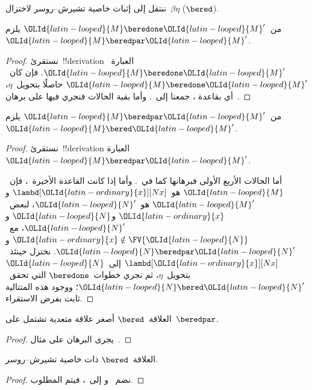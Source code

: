 \documentclass[../../../include/open-logic-section]{subfiles}
\begin{document}


ننتقل إلى إثبات خاصية تشيرش--روسر لاختزال~$\beta\eta$ ($\bered$).

\begin{lem}
  من~$\OLId{latin-looped}{M} \beredone \OLId{latin-looped}{M}'$ يلزم~$\OLId{latin-looped}{M} \beredpar \OLId{latin-looped}{M}'$.
\end{lem}

\begin{proof}
  نستقرئ~!!{derivation} العبارة~$\OLId{latin-looped}{M} \beredone \OLId{latin-looped}{M}'$.
  فإن كان~$\OLId{latin-looped}{M} \beredone \OLId{latin-looped}{M}'$ حاصلًا بتحويل~$\eta$، أي بقاعدة
  ، جمعنا
   إلى~.
  وأما بقية الحالات فنجري فيها على برهان~.
\end{proof}


\begin{lem}
  من~$\OLId{latin-looped}{M} \beredpar \OLId{latin-looped}{M}'$ يلزم~$\OLId{latin-looped}{M} \bered \OLId{latin-looped}{M}'$.
\end{lem}

\begin{proof}
  نستقرئ~!!{derivation} العبارة~$\OLId{latin-looped}{M} \beredpar \OLId{latin-looped}{M}'$.

  أما الحالات الأربع الأولى فبرهانها كما في~.
  وأما إذا كانت القاعدة الأخيرة~، فإن~$\OLId{latin-looped}{M}$
  هو~$\lambd[\OLId{latin-ordinary}{x}][Nx]$ و$\OLId{latin-looped}{M}'$ هو~$\OLId{latin-looped}{N}'$، لبعض~$\OLId{latin-ordinary}{x}$ و$\OLId{latin-looped}{N}$ و$\OLId{latin-looped}{N}'$،
  مع~$\OLId{latin-ordinary}{x} \notin \FV{\OLId{latin-looped}{N}}$ و$\OLId{latin-looped}{N} \beredpar \OLId{latin-looped}{N}'$.
  نختزل حينئذ~$\lambd[\OLId{latin-ordinary}{x}][Nx]$ إلى~$\OLId{latin-looped}{N}$ بتحويل~$\eta$،
  ثم نجري خطوات~$\beredone$ التي تحقق~$\OLId{latin-looped}{N} \bered \OLId{latin-looped}{N}'$؛
  ووجود هذه المتتالية ثابت بفرض الاستقراء.
\end{proof}


\begin{lem}
  العلاقة~$\bered$ أصغر علاقة متعدية تشتمل على~$\beredpar$.
\end{lem}

\begin{proof}
  يجرى البرهان على مثال~.
\end{proof}

\begin{thm}
  العلاقة~$\bered$ ذات خاصية تشيرش--روسر.
\end{thm}

\begin{proof}
  نضم~ و إلى~، فيتم المطلوب.
\end{proof}
\end{document}
